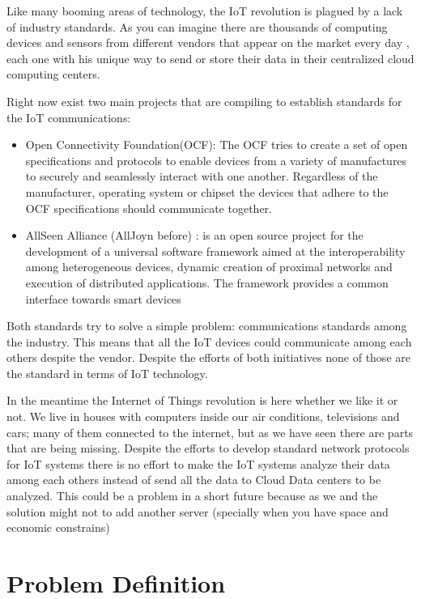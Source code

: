 Like many booming areas of technology, the IoT revolution is plagued by a lack
of industry standards. As you can imagine there are thousands of computing
devices and sensors from different vendors that appear on the market  every day
, each one with his unique way to send  or store their data in their
centralized cloud computing centers.

Right now exist two main projects that are compiling to establish standards for
the IoT communications: 

\begin{itemize}
\item Open Connectivity Foundation(OCF): The OCF tries to  create a set of open
specifications and protocols to enable devices from a variety of manufactures
to securely and seamlessly interact with one another. Regardless of the
manufacturer, operating system or chipset the devices that adhere to
the OCF specifications should communicate together.\cite{Terry}

\item AllSeen Alliance (AllJoyn before) : is an open source project for the
development of a universal software framework aimed at the interoperability
among heterogeneous devices, dynamic creation of proximal networks and
execution of distributed applications. The framework provides a common
interface towards smart devices \cite{Massimo}
\end{itemize}


Both standards try to solve a simple problem: communications standards among
the industry. This means that all the IoT devices could communicate among each
others despite the vendor. Despite the efforts of both initiatives none of
those are the standard in terms of IoT technology. 

In the meantime the Internet of Things revolution is here whether we like it or
not. We live in houses with computers inside our air conditions, televisions
and cars; many of them connected to the internet, but as we have seen there are
parts that are being missing. Despite the efforts to develop standard network
protocols for IoT systems there is no effort to make the IoT systems analyze
their data among each others instead of send  all the data to Cloud Data
centers to be analyzed. This could be a problem in a short future because as we
and  the solution might not to add another server (specially when you have
space and economic constrains)


\section{Problem Definition}
\noindent

